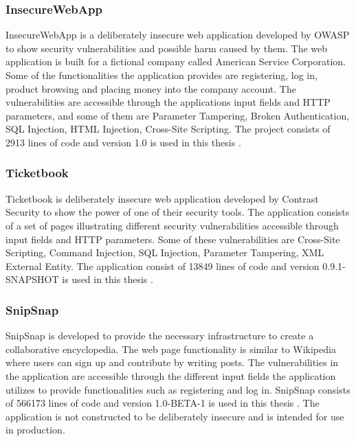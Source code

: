 \subsubsection{InsecureWebApp}
InsecureWebApp is a deliberately insecure web application developed by OWASP to show security vulnerabilities and possible harm caused by them. The web application is built for a fictional company called American Service Corporation. Some of the functionalities the application provides are registering, log in, product browsing and placing money into the company account. The vulnerabilities are accessible through the applications input fields and HTTP parameters, and some of them are Parameter Tampering, Broken Authentication, SQL Injection, HTML Injection, Cross-Site Scripting. The project consists of 2913 lines of code and version 1.0 is used in this thesis \parencite{insecure}. 



\subsubsection{Ticketbook}
Ticketbook is deliberately insecure web application developed by Contrast Security to show the power of one of their security tools. The application consists of a set of pages illustrating different security vulnerabilities accessible through input fields and HTTP parameters. Some of these vulnerabilities are Cross-Site Scripting, Command Injection, SQL Injection, Parameter Tampering, XML External Entity. The application consist of 13849 lines of code and version 0.9.1-SNAPSHOT is used in this thesis \parencite{ticketbook, contrast}.



\subsubsection{SnipSnap}
SnipSnap is developed to provide the necessary infrastructure to create a collaborative encyclopedia. The web page functionality is similar to Wikipedia \parencite{wikipedia} where users can sign up and contribute by writing posts. The vulnerabilities in the application are accessible through the different input fields the application utilizes to provide functionalities such as registering and log in. SnipSnap consists of 566173 lines of code and version 1.0-BETA-1 is used in this thesis \parencite{snipsnap}. The application is not constructed to be deliberately insecure and is intended for use in production.



